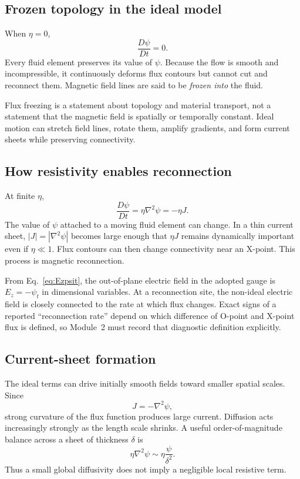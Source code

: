 \documentclass[11pt]{article}
\begin{document}
\subsection{Frozen topology in the ideal model}

When $\eta=0$,
\begin{equation}
\frac{D\psi}{Dt}=0.
\end{equation}
Every fluid element preserves its value of $\psi$. Because the flow is smooth and incompressible, it continuously deforms flux contours but cannot cut and reconnect them. Magnetic field lines are said to be \emph{frozen into} the fluid.

Flux freezing is a statement about topology and material transport, not a statement that the magnetic field is spatially or temporally constant. Ideal motion can stretch field lines, rotate them, amplify gradients, and form current sheets while preserving connectivity.

\subsection{How resistivity enables reconnection}

At finite $\eta$,
\begin{equation}
\frac{D\psi}{Dt}=\eta\nabla^2\psi=-\eta J.
\end{equation}
The value of $\psi$ attached to a moving fluid element can change. In a thin current sheet, $|J|=|\nabla^2\psi|$ becomes large enough that $\eta J$ remains dynamically important even if $\eta\ll1$. Flux contours can then change connectivity near an X-point. This process is magnetic reconnection.

From Eq.~\eqref{eq:Ezpsit}, the out-of-plane electric field in the adopted gauge is $E_z=-\psi_t$ in dimensional variables. At a reconnection site, the non-ideal electric field is closely connected to the rate at which flux changes. Exact signs of a reported ``reconnection rate'' depend on which difference of O-point and X-point flux is defined, so Module~2 must record that diagnostic definition explicitly.

\subsection{Current-sheet formation}

The ideal terms can drive initially smooth fields toward smaller spatial scales. Since
\begin{equation}
J=-\nabla^2\psi,
\end{equation}
strong curvature of the flux function produces large current. Diffusion acts increasingly strongly as the length scale shrinks. A useful order-of-magnitude balance across a sheet of thickness $\delta$ is
\begin{equation}
\eta\nabla^2\psi\sim\eta\frac{\psi}{\delta^2}.
\end{equation}
Thus a small global diffusivity does not imply a negligible local resistive term.
\end{document}
